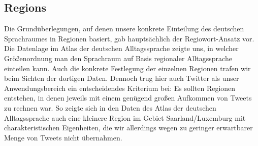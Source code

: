 \documentclass[../Main.tex]{subfiles}
\begin{document}
\subsection{Regions}
Die Grundüberlegungen, auf denen unsere konkrete Einteilung des deutschen Sprachraumes in Regionen basiert, gab hauptsächlich der Regiowort-Ansatz vor. Die Datenlage im Atlas der deutschen Alltagssprache zeigte uns, in welcher Größenordnung man den Sprachraum auf Basis regionaler Alltagssprache einteilen kann. Auch die konkrete Festlegung der einzelnen Regionen trafen wir beim Sichten der dortigen Daten. Dennoch trug hier auch Twitter als unser Anwendungsbereich ein entscheidendes Kriterium bei: Es sollten Regionen entstehen, in denen jeweils mit einem genügend großen Aufkommen von Tweets zu rechnen war. So zeigte sich in den Daten des Atlas der deutschen Alltagssprache auch eine kleinere Region im Gebiet Saarland/Luxemburg mit charakteristischen Eigenheiten, die wir allerdings wegen zu geringer erwartbarer Menge von Tweets nicht übernahmen.
\end{document}
